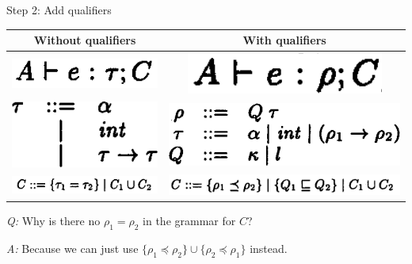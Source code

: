 \documentclass{beamer}
\begin{document}
\begin{frame}{Step 2: Add qualifiers}

\renewcommand{\arraystretch}{1.5}
\begin{tabular}{|c | c|}
\hline
\textbf{Without qualifiers} & \textbf{With qualifiers} \\
\hline
\includegraphics[scale=0.7]{paper_constraint_judgment.png} & \includegraphics[scale=0.55]{paper_constraint_judgment_qualifs.png}\\
\hline  
\includegraphics[scale=0.55]{paper_figure_1_tau.png} & \includegraphics[scale=0.55]{paper_figure_3_no_label.png} \\
\hline
\includegraphics[scale=0.7]{paper_constraint_grammar.png} & \includegraphics[scale=0.55]{paper_constraint_grammar_qualifs.png}\\
\hline
\end{tabular}
\renewcommand{\arraystretch}{1.0}

\bigskip
\pause

\textit{Q:} Why is there no $\rho_1 = \rho_2$ in the grammar for $C$?

\pause

\textit{A:} Because we can just use $\{\rho_1 \preceq \rho_2\} \cup \{\rho_2 \preceq \rho_1 \}$ instead.

\end{frame}
\end{document}
